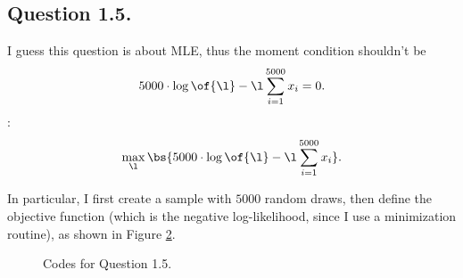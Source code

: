 \documentclass[12pt]{article}
\newcommand{\highlightP}[1]{{\emph{\color{MyPink}{#1}}}}
\theoremstyle{definition}
\begin{document}
\begin{figure}[H]
    \label{dist_adj_means}
\end{figure}

\subsection{Question 1.5.}

I guess this question is about MLE, thus the moment condition shouldn't be 
$$
5000 \cdot \log\of{\l} - \l \sum_{i=1}^{5000}x_i = 0.
$$
\highlightP{I use the following optimization problem for estimating the $\l$}:
$$
\max_{\l} \bs{5000 \cdot \log\of{\l} - \l \sum_{i=1}^{5000}x_i}.
$$

In particular, I first create a sample with $5000$ random draws, then define the objective function (which is the negative log-likelihood, since I use a minimization routine), as shown in Figure \ref{q1_5}.

\begin{figure}[H]
    \noindent\caption{Codes for Question 1.5.}
    \begin{center}
        \label{q1_5}
    \end{center}
\end{figure}
\end{document}
